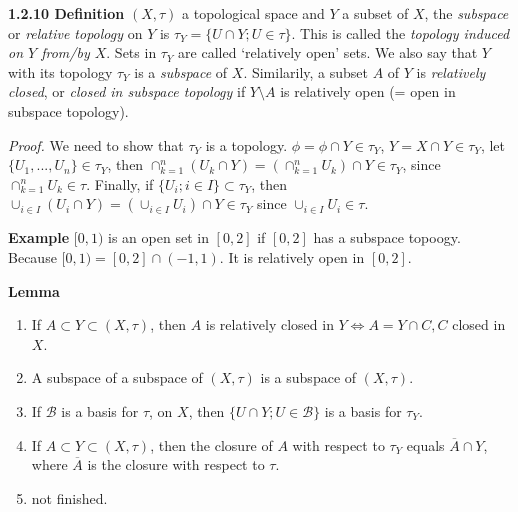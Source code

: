 \documentclass[12pt]{article}
\newcommand{\lrimply}[0] { \Leftrightarrow }
\newcommand{\B}[0] { \mathcal{B} }
\begin{document}
\begin{flushleft}
 { \bf 1.2.10 Definition }$(X, \tau)$ a topological space and $Y$ a subset of $X$, the \emph{subspace} or \emph{relative topology} on $Y$ is $\tau_Y = \{ U \cap Y; U \in \tau \}$. This is called the \emph{topology induced on $Y$ from/by $X$}. Sets in $\tau_Y$ are called `relatively open' sets. We also say that $Y$ with its topology $\tau_Y$ is a \emph{subspace} of $X$. Similarily, a subset $A$ of $Y$ is \emph{relatively closed}, or \emph{closed in subspace topology} if $Y \setminus A$ is relatively open (= open in subspace topology).\begin{flushleft} 
 \emph{Proof.  }We need to show that $\tau_Y$ is a topology. $\phi = \phi \cap Y \in \tau_Y$, $Y = X \cap Y \in \tau_Y$, let $\{ U_1, ..., U_n \} \in \tau_Y$, then $\cap_{k=1}^n (U_k \cap Y) = \left( \cap_{k=1}^n U_k \right) \cap Y \in \tau_Y$, since $\cap_{k=1}^n U_k \in \tau$. Finally, if $\{ U_i; i \in I \} \subset \tau_Y$, then $\cup_{i \in I} ( U_i \cap Y) = \left( \cup_{i \in I} U_i \right) \cap Y \in \tau_Y$ since $\cup_{i \in I} U_i \in \tau$.\end{flushleft}\end{flushleft}\begin{flushleft} 
 { \bf Example }$[0,1)$ is an open set in $[0,2]$ if $[0,2]$ has a subspace topoogy. Because $[0,1) = [0,2] \cap (-1,1)$. It is relatively open in $[0,2]$.\end{flushleft}\begin{flushleft} 
 { \bf Lemma }\begin{enumerate}
\item
                If $A \subset Y \subset (X, \tau)$, then $A$ is relatively closed in $Y \lrimply A = Y \cap C, C$ closed in $X$.
            \item
                A subspace of a subspace of $(X, \tau)$ is a subspace of $(X, \tau)$.
            \item
                If $\B$ is a basis for $\tau$, on $X$, then $\{ U \cap Y; U \in \B \}$ is a basis for $\tau_Y$.
            \item
                If $A \subset Y \subset (X, \tau)$, then the closure of $A$ with respect to $\tau_Y$ equals $\overline{A} \cap Y$, where $\overline{A}$ is the closure with respect to $\tau$. 
            \item
                not finished.
            \end{enumerate}\end{flushleft}
\end{document}
